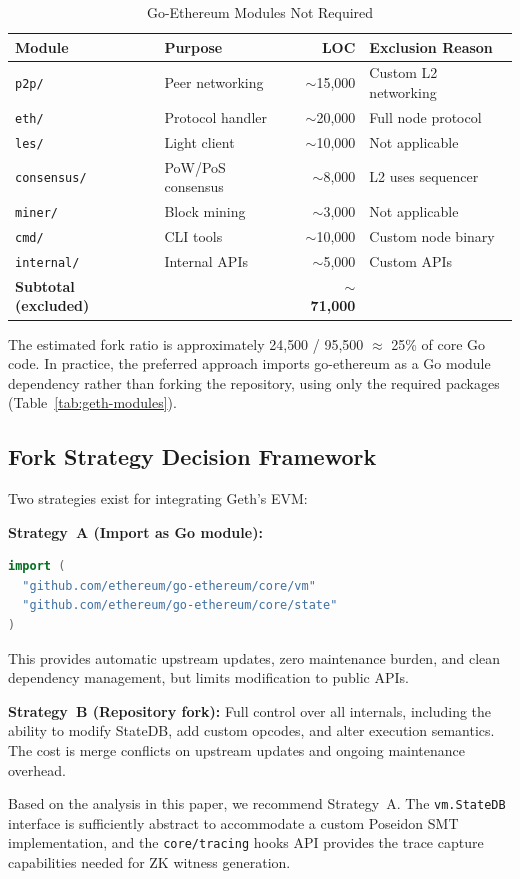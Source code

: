 \begin{table}[htbp]
\caption{Go-Ethereum Modules Not Required}
\label{tab:geth-excluded}
\centering
\begin{tabular}{llrl}
\toprule
\textbf{Module} & \textbf{Purpose} & \textbf{LOC} & \textbf{Exclusion Reason} \\
\midrule
\texttt{p2p/} & Peer networking & ${\sim}$15{,}000 & Custom L2 networking \\
\texttt{eth/} & Protocol handler & ${\sim}$20{,}000 & Full node protocol \\
\texttt{les/} & Light client & ${\sim}$10{,}000 & Not applicable \\
\texttt{consensus/} & PoW/PoS consensus & ${\sim}$8{,}000 & L2 uses sequencer \\
\texttt{miner/} & Block mining & ${\sim}$3{,}000 & Not applicable \\
\texttt{cmd/} & CLI tools & ${\sim}$10{,}000 & Custom node binary \\
\texttt{internal/} & Internal APIs & ${\sim}$5{,}000 & Custom APIs \\
\midrule
\textbf{Subtotal (excluded)} & & ${\sim}$\textbf{71{,}000} & \\
\bottomrule
\end{tabular}
\end{table}

The estimated fork ratio is approximately 24{,}500 / 95{,}500 $\approx$ 25\%
of core Go code. In practice, the preferred approach imports go-ethereum as a
Go module dependency rather than forking the repository, using only the
required packages (Table~\ref{tab:geth-modules}).

\subsection{Fork Strategy Decision Framework}

Two strategies exist for integrating Geth's EVM:

\textbf{Strategy~A (Import as Go module):}
\begin{lstlisting}[language=Go]
import (
  "github.com/ethereum/go-ethereum/core/vm"
  "github.com/ethereum/go-ethereum/core/state"
)
\end{lstlisting}
This provides automatic upstream updates, zero maintenance burden, and clean
dependency management, but limits modification to public APIs.

\textbf{Strategy~B (Repository fork):}
Full control over all internals, including the ability to modify StateDB,
add custom opcodes, and alter execution semantics. The cost is merge
conflicts on upstream updates and ongoing maintenance overhead.

Based on the analysis in this paper, we recommend Strategy~A. The
\texttt{vm.StateDB} interface is sufficiently abstract to accommodate a
custom Poseidon SMT implementation, and the \texttt{core/tracing} hooks
API provides the trace capture capabilities needed for ZK witness generation.
